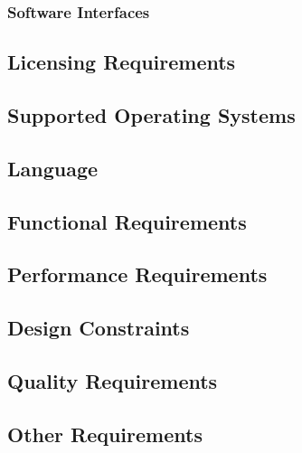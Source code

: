 	\subsubsection{Software Interfaces}
	\label{requirements:interfaces:software}

	

\subsection{Licensing Requirements}
\label{requirements:license}

\subsection{Supported Operating Systems}
\label{requirements:os}

\subsection{Language}
\label{requirements:language}


\subsection{Functional Requirements}
\label{requirements:functional}

\subsection{Performance Requirements}
\label{requirements:performance}


\subsection{Design Constraints}
\label{requirements:constraints}


\subsection{Quality Requirements}
\label{requirements:quality}


\subsection{Other Requirements}
\label{requirements:other}
